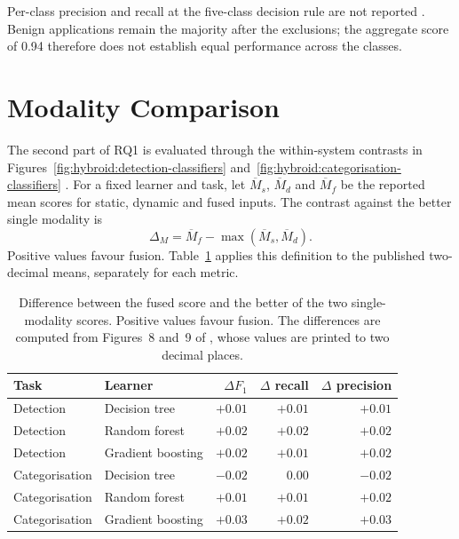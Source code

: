 Per-class precision and recall at the five-class decision rule are not reported
\cite{norouzian2021hybroid}. Benign applications remain the majority after the exclusions;
the aggregate score of 0.94 therefore does not establish equal performance across the classes.

\section{Modality Comparison}
\label{sec:hybroid:11}

The second part of RQ1 is evaluated through the within-system contrasts in
Figures~\ref{fig:hybroid:detection-classifiers} and~\ref{fig:hybroid:categorisation-classifiers}
\cite{norouzian2021hybroid}. For a fixed learner and task, let $\overline M_s$, $\overline M_d$
and $\overline M_f$ be the reported mean scores for static, dynamic and fused inputs. The
contrast against the better single modality is
\begin{equation}
  \Delta_M = \overline M_f-\max\!\left(\overline M_s,\overline M_d\right).
  \label{eq:hybroid:fusiongain}
\end{equation}
Positive values favour fusion. Table~\ref{tab:hybroid:fusion-effects} applies this definition
to the published two-decimal means, separately for each metric.

\begin{table}
  \caption{Difference between the fused score and the better of the two single-modality scores.
  Positive values favour fusion. The differences are computed from Figures~8 and~9 of
  \cite{norouzian2021hybroid}, whose values are printed to two decimal places.}
  \label{tab:hybroid:fusion-effects}
  \centering
  \begin{tabular}{llrrr}
    \toprule
    Task & Learner & $\Delta F_1$ & $\Delta$ recall & $\Delta$ precision \\
    \midrule
    Detection      & Decision tree     & $+0.01$ & $+0.01$ & $+0.01$ \\
    Detection      & Random forest     & $+0.02$ & $+0.02$ & $+0.02$ \\
    Detection      & Gradient boosting & $+0.02$ & $+0.01$ & $+0.02$ \\
    \midrule
    Categorisation & Decision tree     & $-0.02$ & $ 0.00$ & $-0.02$ \\
    Categorisation & Random forest     & $+0.01$ & $+0.01$ & $+0.02$ \\
    Categorisation & Gradient boosting & $+0.03$ & $+0.02$ & $+0.03$ \\
    \bottomrule
  \end{tabular}
\end{table}

